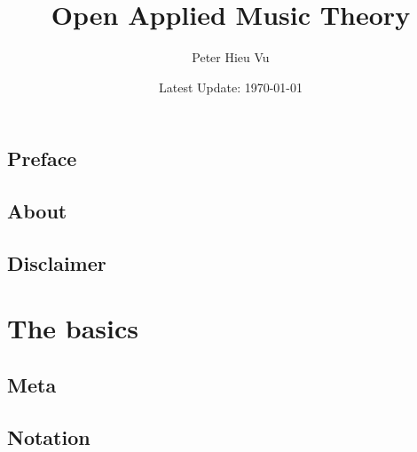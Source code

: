\documentclass[12pt]{book}
\title{Open Applied Music Theory}
\author{Peter Hieu Vu}
\date{Latest Update: \today}
\renewcommand{\chaptermark}[1]{ \markboth{#1}{} }
\renewcommand{\sectionmark}[1]{ \markright{#1}{} }
\newcommand\onlyinsubfile[1]{#1}
\newcommand\notinsubfile[1]{}
\begin{document}
\renewcommand{\onlyinsubfile}[1]{}
\renewcommand{\notinsubfile}[1]{#1}

    \maketitle
    
    \frontmatter
    \chapter{Preface}\label{preface}
    
    
    \chapter{About}\label{about}
    
    
    \tableofcontents
    
    \chapter{Disclaimer}\label{disclaimer}
    
    
    \mainmatter
    \setcounter{chapter}{-1}
    \renewcommand{\chaptermark}[1]{ \markboth{Ch.\thechapter\enspace #1}{} }
    \renewcommand{\sectionmark}[1]{ \markright{\thesection\enspace #1}{} }
    
    \part{The basics}

        \chapter{Meta}\label{ch0}
            

        \chapter{Notation}\label{ch1}
            
\end{document}
